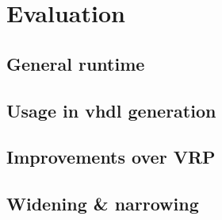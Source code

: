 \chapter{Evaluation}\label{sec:eval}

\section{General runtime}
\section{Usage in vhdl generation}
\section{Improvements over VRP}
\section{Widening \& narrowing}